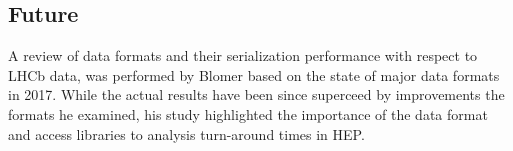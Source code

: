 \documentclass[../main-v1.tex]{subfiles}
\begin{document}


\subsection{Future }

A review of data formats and their serialization performance with respect to LHCb data, was performed by Blomer based on the state of major data formats in 2017\cite{Blomer:2018icl}.  While the actual results have been since superceed by improvements the formats he examined, his study
highlighted the importance of the data format and access libraries to analysis turn-around times in HEP.

%
%

\end{document}
